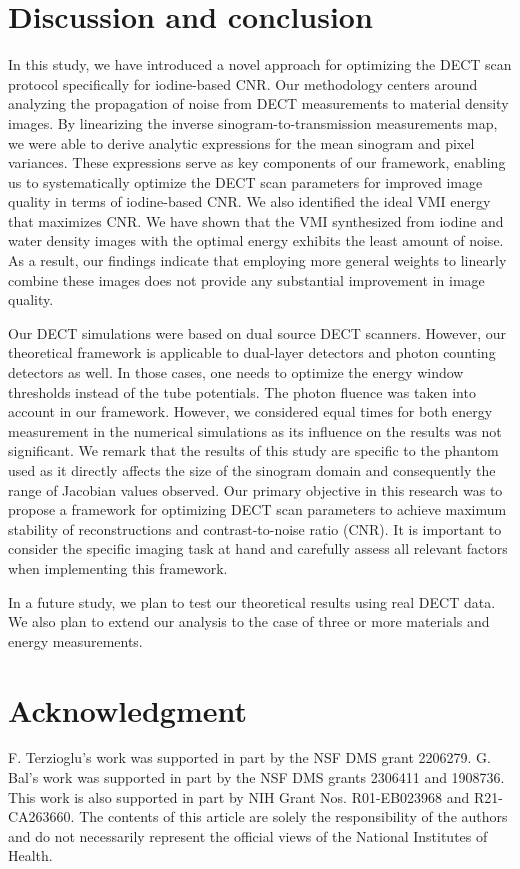 \documentclass[12pt,twoside]{article}   %
\begin{document}
\section{Discussion and conclusion}\label{sec:conclusion}
In this study, we have introduced a novel approach for optimizing the DECT scan protocol specifically for iodine-based CNR. Our methodology centers around analyzing the propagation of noise from DECT measurements to material density images. By linearizing the inverse sinogram-to-transmission measurements map, we were able to derive analytic expressions for the mean sinogram and pixel variances. These expressions serve as key components of our framework, enabling us to systematically optimize the DECT scan parameters for improved image quality in terms of iodine-based CNR. We also identified the ideal VMI energy that maximizes CNR. We have shown that the VMI synthesized from iodine and water density images with the optimal energy exhibits the least amount of noise. As a result, our findings indicate that employing more general weights to linearly combine these images does not provide any substantial improvement in image quality.

Our DECT simulations were based on dual source DECT scanners. However, our theoretical framework is applicable to dual-layer detectors and photon counting detectors as well. In those cases, one needs to optimize the energy window thresholds instead of the tube potentials. The photon fluence was taken into account in our framework. However, we considered equal times for both energy measurement in the numerical simulations as its influence on the results was not significant. We remark that the results of this study are specific to the phantom used as it directly affects the size of the sinogram domain and consequently the range of Jacobian values observed. Our primary objective in this research was to propose a framework for optimizing DECT scan parameters to achieve maximum stability of reconstructions and contrast-to-noise ratio (CNR). It is important to consider the specific imaging task at hand and carefully assess all relevant factors when implementing this framework.

In a future study, we plan to test our theoretical results using real DECT data. We also plan to extend our analysis to the case of three or more materials and energy measurements.
\section*{Acknowledgment}
F. Terzioglu's work was supported in part by the NSF DMS grant 2206279. G. Bal's work was supported in part by the NSF DMS grants 2306411 and 1908736. This work is also supported in part by NIH Grant Nos. R01-EB023968 and R21-CA263660. The contents of this article are solely the responsibility of the authors and do not necessarily represent the official views of the National Institutes of Health.



\end{document}
